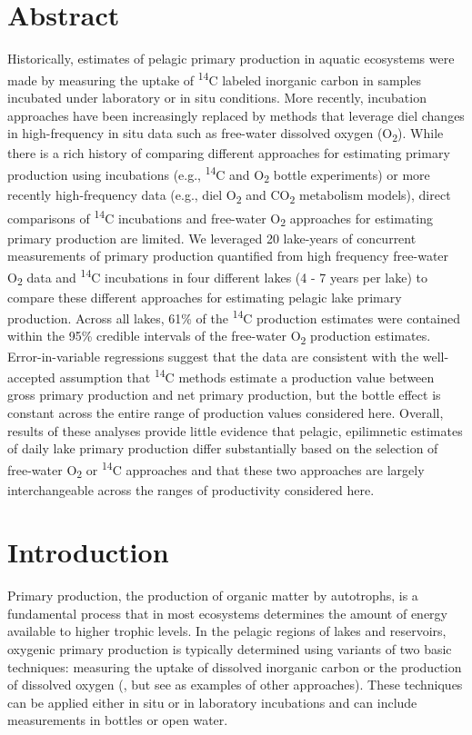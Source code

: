 \documentclass[12pt, oneside]{article}
\begin{document}
\section*{Abstract}
Historically, estimates of pelagic primary production in aquatic ecosystems were made by measuring the uptake of \textsuperscript{14}C labeled inorganic carbon in samples incubated under laboratory or in situ conditions.  More recently, incubation approaches have been increasingly replaced by methods that leverage diel changes in high-frequency in situ data such as free-water dissolved oxygen (O\textsubscript{2}). While there is a rich history of comparing different approaches for estimating primary production using incubations (e.g., \textsuperscript{14}C and O\textsubscript{2} bottle experiments) or more recently high-frequency data (e.g., diel O\textsubscript{2} and CO\textsubscript{2} metabolism models), direct comparisons of \textsuperscript{14}C incubations and free-water O\textsubscript{2} approaches for estimating primary production are limited. We leveraged 20 lake-years of concurrent measurements of primary production quantified from high frequency free-water O\textsubscript{2} data and \textsuperscript{14}C incubations in four different lakes (4 - 7 years per lake) to compare these different approaches for estimating pelagic lake primary production. Across all lakes, 61\% of the \textsuperscript{14}C production estimates were contained within the 95\% credible intervals of the free-water O\textsubscript{2} production estimates. Error-in-variable regressions suggest that the data are consistent with the well-accepted assumption that \textsuperscript{14}C methods estimate a production value between gross primary production and net primary production, but the bottle effect is constant across the entire range of production values considered here. Overall, results of these analyses provide little evidence that pelagic, epilimnetic estimates of daily lake primary production differ substantially based on the selection of free-water O\textsubscript{2} or \textsuperscript{14}C approaches and that these two approaches are largely interchangeable across the ranges of productivity considered here. 

\vspace{\baselineskip}
\newpage

\section*{Introduction}
\label{S:1}
Primary production, the production of organic matter by autotrophs, is a fundamental process that in most ecosystems determines the amount of energy available to higher trophic levels.  In the pelagic regions of lakes and reservoirs, oxygenic primary production is typically determined using variants of two basic techniques:  measuring the uptake of dissolved inorganic carbon or the production of dissolved oxygen (\citealt{hall_measuring_2007}, but see \citealt{peeters_lake_2016,peeters_calculation_2019} as examples of other approaches). These techniques can be applied either in situ or in laboratory incubations and can include measurements in bottles or open water.
\end{document}
